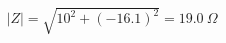 \documentclass[preview]{standalone}
\begin{document}
\begin{align*}
|Z| = \sqrt{10^2 + (-16.1)^2} = 19.0\ \Omega
\end{align*}
\end{document}

